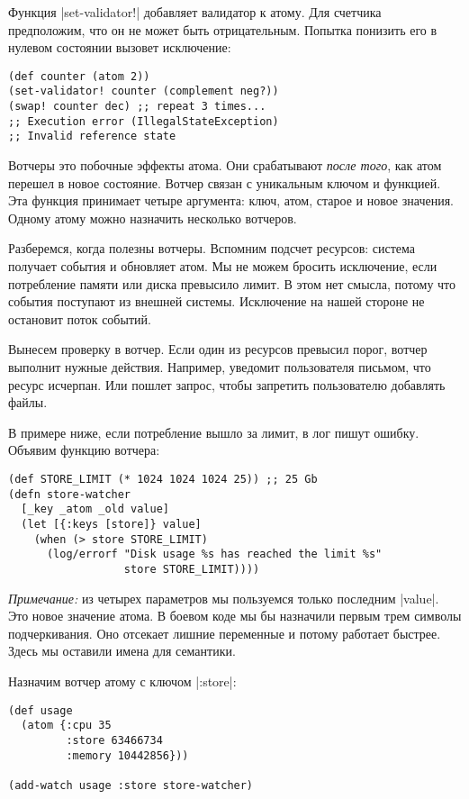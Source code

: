 Функция \spverb|set-validator!| добавляет валидатор к атому. Для счетчика
предположим, что он не может быть отрицательным. Попытка понизить его в нулевом
состоянии вызовет исключение:

\begin{verbatim}
(def counter (atom 2))
(set-validator! counter (complement neg?))
(swap! counter dec) ;; repeat 3 times...
;; Execution error (IllegalStateException)
;; Invalid reference state
\end{verbatim}

Вотчеры это побочные эффекты атома. Они срабатывают \emph{после того}, как атом
перешел в новое состояние. Вотчер связан с уникальным ключом и функцией. Эта
функция принимает четыре аргумента: ключ, атом, старое и новое значения. Одному
атому можно назначить несколько вотчеров.

Разберемся, когда полезны вотчеры. Вспомним подсчет ресурсов: система получает
события и обновляет атом. Мы не можем бросить исключение, если потребление
памяти или диска превысило лимит. В этом нет смысла, потому что события
поступают из внешней системы. Исключение на нашей стороне не остановит поток
событий.

Вынесем проверку в вотчер. Если один из ресурсов превысил порог, вотчер выполнит
нужные действия. Например, уведомит пользователя письмом, что ресурс
исчерпан. Или пошлет запрос, чтобы запретить пользователю добавлять файлы.

В примере ниже, если потребление вышло за лимит, в лог пишут ошибку. Объявим
функцию вотчера:

\begin{verbatim}
(def STORE_LIMIT (* 1024 1024 1024 25)) ;; 25 Gb
(defn store-watcher
  [_key _atom _old value]
  (let [{:keys [store]} value]
    (when (> store STORE_LIMIT)
      (log/errorf "Disk usage %s has reached the limit %s"
                  store STORE_LIMIT))))
\end{verbatim}

\emph{Примечание:} из четырех параметров мы пользуемся только последним
\spverb|value|. Это новое значение атома. В боевом коде мы бы назначили первым
трем символы подчеркивания. Оно отсекает лишние переменные и потому работает
быстрее. Здесь мы оставили имена для семантики.

Назначим вотчер атому с ключом \spverb|:store|:

\begin{verbatim}
(def usage
  (atom {:cpu 35
         :store 63466734
         :memory 10442856}))

(add-watch usage :store store-watcher)
\end{verbatim}

